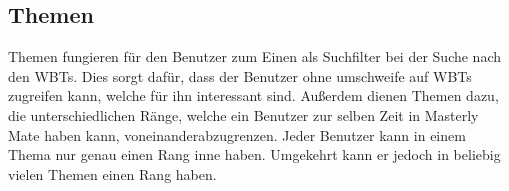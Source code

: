 \subsection{Themen}
Themen fungieren für den Benutzer zum Einen als Suchfilter bei der Suche nach
den WBTs. Dies sorgt dafür, dass der Benutzer ohne umschweife auf WBTs zugreifen
kann, welche für ihn interessant sind. Außerdem dienen Themen dazu, die
unterschiedlichen Ränge, welche ein Benutzer zur selben Zeit in Masterly Mate
haben kann, voneinanderabzugrenzen. Jeder Benutzer kann in einem Thema nur genau
einen Rang inne haben. Umgekehrt kann er jedoch in beliebig vielen Themen einen
Rang haben.